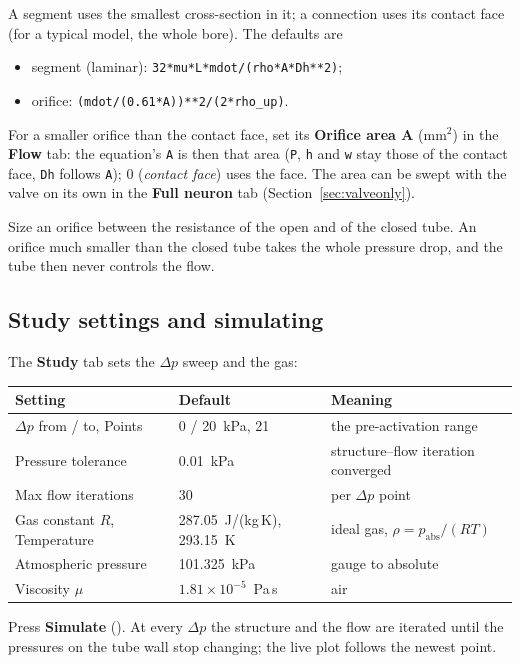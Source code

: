 \documentclass[11pt,a4paper]{article}
\newcommand{\code}[1]{\texttt{#1}}
\newcommand{\menu}[1]{\textsf{\textbf{#1}}}
\newcommand{\key}[1]{\fbox{\footnotesize\textsf{#1}}}
\begin{document}
A segment uses the smallest cross-section in it; a connection uses its contact face (for a typical model, the whole
bore). The defaults are
\begin{itemize}
\item segment (laminar): \code{32*mu*L*mdot/(rho*A*Dh**2)};
\item orifice: \code{(mdot/(0.61*A))**2/(2*rho\_up)}.
\end{itemize}
For a smaller orifice than the contact face, set its \menu{Orifice area A} (mm$^2$) in the \menu{Flow} tab: the
equation's \code{A} is then that area (\code{P}, \code{h} and \code{w} stay those of the contact face, \code{Dh}
follows \code{A}); 0 (\emph{contact face}) uses the face. The area can be swept with the valve on its own in the
\menu{Full neuron} tab (Section~\ref{sec:valveonly}).

\begin{tip}
Size an orifice between the resistance of the open and of the closed tube. An orifice much smaller than the
closed tube takes the whole pressure drop, and the tube then never controls the flow.
\end{tip}

\subsection{Study settings and simulating}

The \menu{Study} tab sets the $\Delta p$ sweep and the gas:
\begin{center}\small
\begin{tabular}{@{}lll@{}}
\toprule
Setting & Default & Meaning \\
\midrule
$\Delta p$ from / to, Points & 0 / 20~kPa, 21 & the pre-activation range \\
Pressure tolerance & 0.01~kPa & structure--flow iteration converged \\
Max flow iterations & 30 & per $\Delta p$ point \\
Gas constant $R$, Temperature & 287.05~J/(kg\,K), 293.15~K & ideal gas, $\rho = p_\text{abs}/(RT)$ \\
Atmospheric pressure & 101.325~kPa & gauge to absolute \\
Viscosity $\mu$ & $1.81\times10^{-5}$~Pa\,s & air \\
\bottomrule
\end{tabular}
\end{center}

Press \menu{Simulate} (\key{F5}). At every $\Delta p$ the structure and the flow are iterated until the pressures on
the tube wall stop changing; the live plot follows the newest point.
\end{document}
